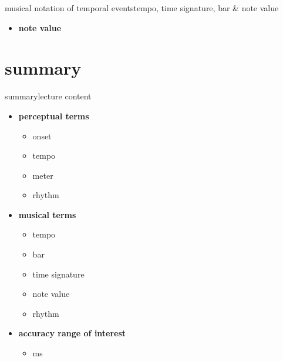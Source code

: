 \begin{frame}{musical notation of temporal events}{tempo, time signature, bar \& note value}
\begin{itemize}
\begin{itemize}
{\begin{flushright}
                                \texttt{[image: onset\_timesigs]}
                            \end{flushright}}
                    \end{itemize}
                \smallskip
                \item<1->	\textbf{note value}
            \end{itemize}
        \end{frame}
    
    \section{summary}
        \begin{frame}{summary}{lecture content}
            \begin{itemize}
                \item   \textbf{perceptual terms}
                    \begin{itemize}
                        \item   onset
                        \item   tempo
                        \item   meter
                        \item   rhythm
                    \end{itemize}
                \bigskip
                \item   \textbf{musical terms}
                    \begin{itemize}
                        \item   tempo
                        \item   bar
                        \item   time signature
                        \item   note value
                        \item   rhythm
                    \end{itemize}
                \item   \textbf{accuracy range of interest}
                    \begin{itemize}
                        \item   \unit[2--300]{ms}
                    \end{itemize}
            \end{itemize}
            
        \end{frame}

